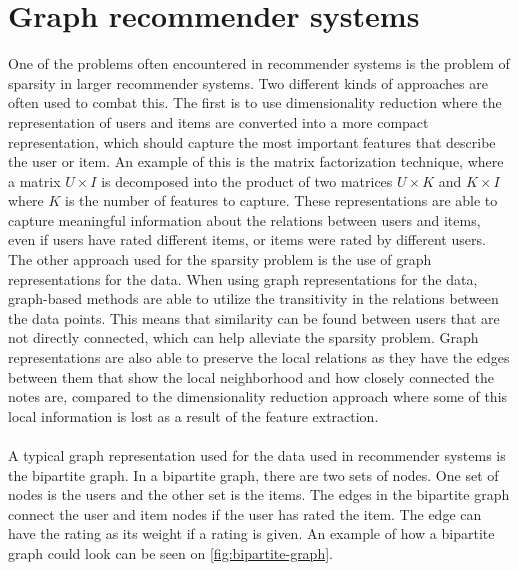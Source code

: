 \section{Graph recommender systems}
One of the problems often encountered in recommender systems is the problem of sparsity in larger recommender systems.
Two different kinds of approaches are often used to combat this. 
The first is to use dimensionality reduction where the representation of users and items are converted into a more compact representation, which should capture the most important features that describe the user or item.
An example of this is the matrix factorization technique, where a matrix $U \times I$ is decomposed into the product of two matrices $U \times K $ and $ K \times I$ where $K$ is the number of features to capture.
These representations are able to capture meaningful information about the relations between users and items, even if users have rated different items, or items were rated by different users. 
The other approach used for the sparsity problem is the use of graph representations for the data.
When using graph representations for the data, graph-based methods are able to utilize the transitivity in the relations between the data points. 
This means that similarity can be found between users that are not directly connected, which can help alleviate the sparsity problem.
Graph representations are also able to preserve the local relations as they have the edges between them that show the local neighborhood and how closely connected the notes are, compared to the dimensionality reduction approach where some of this local information is lost as a result of the feature extraction\cite{RecommenderHandbook2015}.
\\\\
A typical graph representation used for the data used in recommender systems is the bipartite graph.
In a bipartite graph, there are two sets of nodes.
One set of nodes is the users and the other set is the items.
The edges in the bipartite graph connect the user and item nodes if the user has rated the item. 
The edge can have the rating as its weight if a rating is given.
An example of how a bipartite graph could look can be seen on \autoref{fig:bipartite-graph}.
